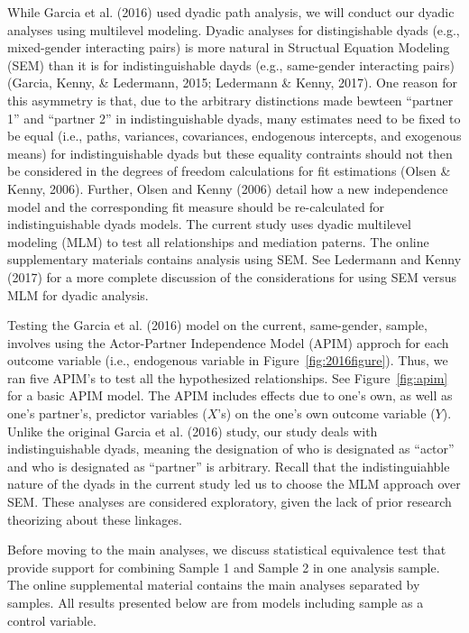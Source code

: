 \documentclass[man]{apa6}
\begin{document}
While Garcia et al. (2016) used dyadic path analysis, we will conduct
our dyadic analyses using multilevel modeling. Dyadic analyses for
distingishable dyads (e.g., mixed-gender interacting pairs) is more
natural in Structual Equation Modeling (SEM) than it is for
indistinguishable dayds (e.g., same-gender interacting pairs) (Garcia,
Kenny, \& Ledermann, 2015; Ledermann \& Kenny, 2017). One reason for
this asymmetry is that, due to the arbitrary distinctions made bewteen
\enquote{partner 1} and \enquote{partner 2} in indistinguishable dyads,
many estimates need to be fixed to be equal (i.e., paths, variances,
covariances, endogenous intercepts, and exogenous means) for
indistinguishable dyads but these equality contraints should not then be
considered in the degrees of freedom calculations for fit estimations
(Olsen \& Kenny, 2006). Further, Olsen and Kenny (2006) detail how a new
independence model and the corresponding fit measure should be
re-calculated for indistinguishable dyads models. The current study uses
dyadic multilevel modeling (MLM) to test all relationships and mediation
paterns. The online supplementary materials contains analysis using SEM.
See Ledermann and Kenny (2017) for a more complete discussion of the
considerations for using SEM versus MLM for dyadic analysis.

Testing the Garcia et al. (2016) model on the current, same-gender,
sample, involves using the Actor-Partner Independence Model (APIM)
approch for each outcome variable (i.e., endogenous variable in
Figure~\ref{fig:2016figure}). Thus, we ran five APIM's to test all the
hypothesized relationships. See Figure~\ref{fig:apim} for a basic APIM
model. The APIM includes effects due to one's own, as well as one's
partner's, predictor variables (\(X\)'s) on the one's own outcome
variable (\(Y\)). Unlike the original Garcia et al. (2016) study, our
study deals with indistinguishable dyads, meaning the designation of who
is designated as \enquote{actor} and who is designated as
\enquote{partner} is arbitrary. Recall that the indistinguiahble nature
of the dyads in the current study led us to choose the MLM approach over
SEM. These analyses are considered exploratory, given the lack of prior
research theorizing about these linkages.

Before moving to the main analyses, we discuss statistical equivalence
test that provide support for combining Sample 1 and Sample 2 in one
analysis sample. The online supplemental material contains the main
analyses separated by samples. All results presented below are from
models including sample as a control variable.
\end{document}

